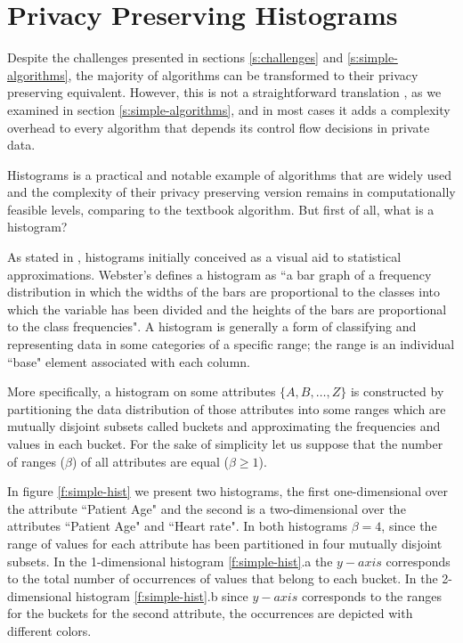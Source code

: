\section{Privacy Preserving Histograms}\label{s:histograms}
Despite the challenges presented in sections \ref{s:challenges} and \ref{s:simple-algorithms}, the majority of algorithms can be transformed to their privacy preserving equivalent.
However, this is not a straightforward translation , as we examined in section \ref{s:simple-algorithms}, and in most cases it adds a complexity overhead to every algorithm that depends its control flow decisions in private data.

Histograms is a practical and notable example of algorithms that are widely used and the complexity of their privacy preserving version remains in computationally feasible levels, comparing to the textbook algorithm.
But first of all, what is a histogram?

As stated in \cite{ioannidis2003history}, histograms initially conceived as a visual aid to statistical approximations.
Webster’s defines a histogram as ``a bar graph of a frequency distribution in which the widths of the bars are proportional to the classes into which the variable has been divided and the heights of the bars are proportional to the class frequencies".
A histogram is generally a form of classifying and representing data in some categories of a specific range; the range is an individual ``base" element associated with each column.

More specifically, a histogram on some attributes $\{A, B, \dots, Z\}$ is constructed by partitioning the data distribution of those attributes into some ranges which are mutually disjoint subsets called buckets and approximating the frequencies and values in each bucket.
For the sake of simplicity let us suppose that the number of ranges ($\beta$) of all attributes are equal ($\beta \geq 1$).

In figure \ref{f:simple-hist} we present two histograms, the first one-dimensional over the attribute ``Patient Age" and the second is a two-dimensional over the attributes ``Patient Age" and ``Heart rate".
In both histograms $\beta = 4$, since the range of values for each attribute has been partitioned in four mutually disjoint subsets.
In the 1-dimensional histogram \ref{f:simple-hist}.a the $y-axis$ corresponds to the total number of occurrences of values that belong to each bucket.
In the 2-dimensional histogram \ref{f:simple-hist}.b since $y-axis$ corresponds to the ranges for the buckets for the second attribute, the occurrences are depicted with different colors.


